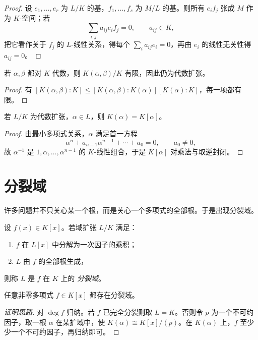 \begin{proof}
设 $e_1,\dots,e_r$ 为 $L/K$ 的基，$f_1,\dots,f_s$ 为 $M/L$ 的基。则所有 $e_if_j$ 张成 $M$ 作为 $K$-空间；若
\[
 \sum_{i,j} a_{ij}e_if_j=0,\qquad a_{ij}\in K,
\]
把它看作关于 $f_j$ 的 $L$-线性关系，得每个 $\sum_i a_{ij}e_i=0$，再由 $e_i$ 的线性无关性得 $a_{ij}=0$。
\end{proof}

\begin{corollary}
若 $\alpha,\beta$ 都对 $K$ 代数，则 $K(\alpha,\beta)/K$ 有限，因此仍为代数扩张。
\end{corollary}

\begin{proof}
有 $[K(\alpha,\beta):K]\le [K(\alpha,\beta):K(\alpha)][K(\alpha):K]$，每一项都有限。
\end{proof}

\begin{proposition}
若 $L/K$ 为代数扩张，$\alpha\in L$，则 $K(\alpha)=K[\alpha]$。
\end{proposition}

\begin{proof}
由最小多项式关系，$\alpha$ 满足首一方程
\[
 \alpha^n+a_{n-1}\alpha^{n-1}+\cdots+a_0=0,
\qquad a_0\ne 0,
\]
故 $\alpha^{-1}$ 是 $1,\alpha,\dots,\alpha^{n-1}$ 的 $K$-线性组合，于是 $K[\alpha]$ 对乘法与取逆封闭。
\end{proof}

\section{分裂域}

许多问题并不只关心某一个根，而是关心一个多项式的全部根。于是出现分裂域。

\begin{definition}
设 $f(x)\in K[x]$。若域扩张 $L/K$ 满足：
\begin{enumerate}[label=(\roman*)]
\item $f$ 在 $L[x]$ 中分解为一次因子的乘积；
\item $L$ 由 $f$ 的全部根生成，
\end{enumerate}
则称 $L$ 是 $f$ 在 $K$ 上的 \emph{分裂域}。
\end{definition}

\begin{theorem}[存在性]
任意非零多项式 $f\in K[x]$ 都存在分裂域。
\end{theorem}

\begin{proof}[证明思路]
对 $\deg f$ 归纳。若 $f$ 已完全分裂则取 $L=K$。否则令 $p$ 为一个不可约因子，取一根 $\alpha$ 在某扩域中，使 $K(\alpha)\cong K[x]/(p)$。在 $K(\alpha)$ 上，$f$ 至少少一个不可约因子，再归纳即可。
\end{proof}


